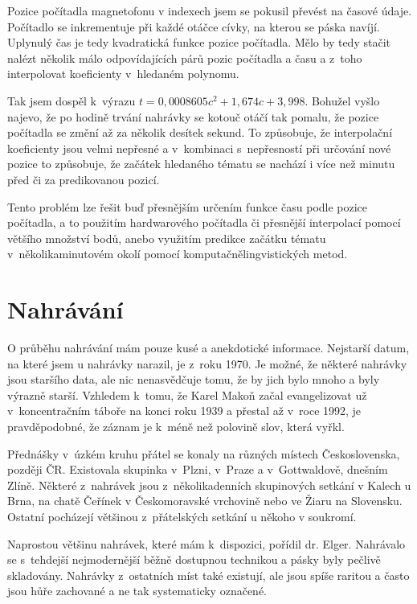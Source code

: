 Pozice počítadla magnetofonu v indexech
jsem se pokusil převést na časové údaje. Počítadlo se inkrementuje při každé
otáčce cívky, na kterou se páska navíjí. Uplynulý čas je tedy kvadratická funkce
pozice počítadla. Mělo by tedy stačit nalézt několik málo odpovídajících párů
pozic počítadla a času a z~toho interpolovat koeficienty v~hledaném polynomu.

Tak jsem dospěl k~výrazu $t = 0,0008605c^2 + 1,674c + 3,998$. Bohužel vyšlo
najevo, že po hodině trvání nahrávky se kotouč otáčí tak pomalu, že pozice
počítadla se změní až za několik desítek sekund. To způsobuje, že interpolační
koeficienty jsou velmi nepřesné a v~kombinaci s~nepřesností při určování nové
pozice to způsobuje, že začátek hledaného tématu se nachází i více než minutu
před či za predikovanou pozicí.

Tento problém lze řešit buď přesnějším určením funkce času podle pozice
počítadla, a to použitím hardwarového počítadla či přesnější interpolací
pomocí většího množství bodů, anebo využitím predikce začátku
tématu v~několikaminutovém okolí pomocí komputačnělingvistických metod.

\section{Nahrávání}
\label{sec:data:rec}

O průběhu nahrávání mám pouze kusé a anekdotické informace. Nejstarší datum, na
které jsem u nahrávky narazil, je z~roku 1970. Je možné, že některé nahrávky
jsou staršího data, ale nic nenasvědčuje tomu, že by jich bylo mnoho a byly
výrazně starší. Vzhledem k~tomu, že Karel Makoň začal evangelizovat už
v~koncentračním táboře na konci roku 1939 a přestal až v~roce 1992, je
pravděpodobné, že záznam je k~méně než polovině slov, která vyřkl.

Přednášky v~úzkém kruhu přátel se konaly na různých místech Československa,
později ČR.
Existovala skupinka v~Plzni, v~Praze a v~Gottwaldově, dnešním
Zlíně. Některé z~nahrávek jsou
z~několikadenních skupinových setkání v Kalech u Brna, na chatě Čeřínek v
Českomoravské vrchovině nebo ve Žiaru na Slovensku. Ostatní pocházejí většinou
z~přátelských setkání u někoho v soukromí.

Naprostou většinu nahrávek, které mám k~dispozici, pořídil dr. Elger.
Nahrávalo se s~tehdejší nejmodernější běžně dostupnou technikou a pásky byly pečlivě
skladovány. Nahrávky z~ostatních míst
také existují, ale jsou spíše raritou a často jsou hůře zachované a ne tak
systematicky označené.

